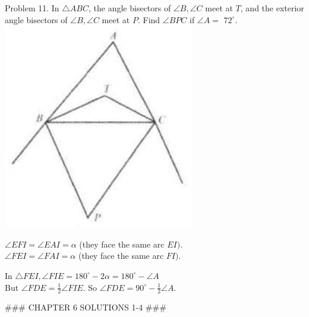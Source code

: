 \documentclass[10pt]{article}
\begin{document}
Problem 11. In \(\triangle A B C\), the angle bisectors of \(\angle B, \angle C\) meet at \(T\), and the exterior angle bisectors of \(\angle B, \angle C\) meet at \(P\). Find \(\angle B P C\) if \(\angle A=\) \(72^{\circ}\).\\
\includegraphics[max width=\textwidth, center]{2025_04_17_97bc1f7e44d93c271a88g-208(1)}


\(\angle E F I=\angle E A I=\alpha\) (they face the same arc \(E I)\).\\
\(\angle F E I=\angle F A I=\alpha\) (they face the same arc \(F I)\).

In \(\triangle F E I, \angle F I E=180^{\circ}-2 \alpha=180^{\circ}-\angle A\)\\
But \(\angle F D E=\frac{1}{2} \angle F I E\). So \(\angle F D E=90^{\circ}-\frac{1}{2} \angle A\).

### CHAPTER 6 SOLUTIONS 1-4 ###
\end{document}
